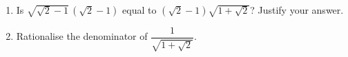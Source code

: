 \begin{enumerate}
\item[(a)] Is $\sqrt{\sqrt2-1}\,\left(\sqrt2-1\right)$ equal to $\left(\sqrt2-1\right)\sqrt{1+\sqrt2}$? Justify your answer.
\item[(b)] Rationalise the denominator of $\dfrac{1}{\sqrt{1+\sqrt2}}$.
\end{enumerate}
